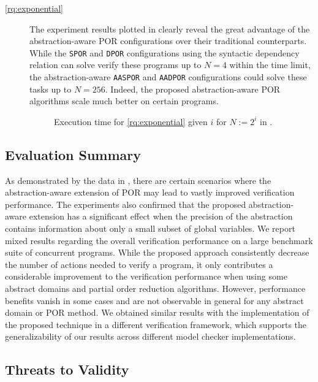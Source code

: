 \documentclass[numbook]{svjour3}
\begin{document}
\begin{description}
	\item[\ref{rq:exponential}] The experiment results plotted in  clearly reveal the great advantage of the abstraction-aware POR configurations over their traditional counterparts. While the \texttt{SPOR} and \texttt{DPOR} configurations using the syntactic dependency relation can solve verify these programs up to $N=4$ within the time limit, the abstraction-aware \texttt{AASPOR} and \texttt{AADPOR} configurations could solve these tasks up to $N=256$. Indeed, the proposed abstraction-aware POR algorithms scale much better on certain programs.

    \begin{figure}[t]
    	\centering
    	
    	\caption{Execution time for \ref{rq:exponential} given $i$ for $N:=2^i$ in .}
    	\label{fig:exp-quantile}
    \end{figure}
    
\end{description}

\subsection{Evaluation Summary}
\label{sec:por-expconclusion}

As demonstrated by the data in , there are certain scenarios where the abstraction-aware extension of POR may lead to vastly improved verification performance. The experiments also confirmed that the proposed abstraction-aware extension has a significant effect when the precision of the abstraction contains information about only a small subset of global variables. We report mixed results regarding the overall verification performance on a large benchmark suite of concurrent programs. While the proposed approach consistently decrease the number of actions needed to verify a program, it only contributes a considerable improvement to the verification performance when using some abstract domains and partial order reduction algorithms. However, performance benefits vanish in some cases and are not observable in general for any abstract domain or POR method. We obtained similar results with the implementation of the proposed technique in a different verification framework, which supports the generalizability of our results across different model checker implementations.

\subsection{Threats to Validity}
\label{sec:por-threats}
\end{document}
